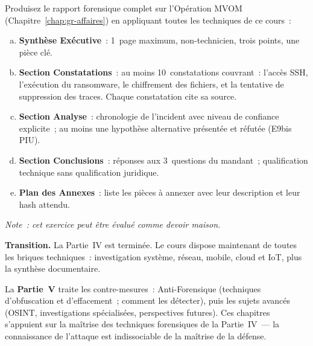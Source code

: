 \begin{boxexo}[title={\ding{45}\quad Exercice~19.3 --- Rapport complet \niveauexpert}]
Produisez le rapport forensique complet sur l'Opération MVOM
(Chapitre~\ref{chap:gr-affaires}) en appliquant toutes les
techniques de ce cours~:
\begin{enumerate}[(a)]
    \item \textbf{Synthèse Exécutive}~: 1~page maximum,
          non-technicien, trois points, une pièce clé.
    \item \textbf{Section Constatations}~: au moins 10~constatations
          couvrant~: l'accès SSH, l'exécution du ransomware,
          le chiffrement des fichiers, et la tentative de suppression
          des traces. Chaque constatation cite sa source.
    \item \textbf{Section Analyse}~: chronologie de l'incident avec
          niveau de confiance explicite~; au moins une hypothèse
          alternative présentée et réfutée (E9bis PIU).
    \item \textbf{Section Conclusions}~: réponses aux 3~questions
          du mandant~; qualification technique sans qualification
          juridique.
    \item \textbf{Plan des Annexes}~: liste les pièces à annexer
          avec leur description et leur hash attendu.
\end{enumerate}
\textit{Note~: cet exercice peut être évalué comme devoir maison.}
\end{boxexo}

\bigskip

\begin{boxinfo}
\textbf{Transition.} La Partie~IV est terminée. Le cours dispose
maintenant de toutes les briques techniques~: investigation système,
réseau, mobile, cloud et IoT, plus la synthèse documentaire.

La \textbf{Partie~V} traite les contre-mesures~: Anti-Forensique
(techniques d'obfuscation et d'effacement~; comment les détecter),
puis les sujets avancés (OSINT, investigations spécialisées,
perspectives futures). Ces chapitres s'appuient sur la maîtrise
des techniques forensiques de la Partie~IV~--- la connaissance
de l'attaque est indissociable de la maîtrise de la défense.
\end{boxinfo}
